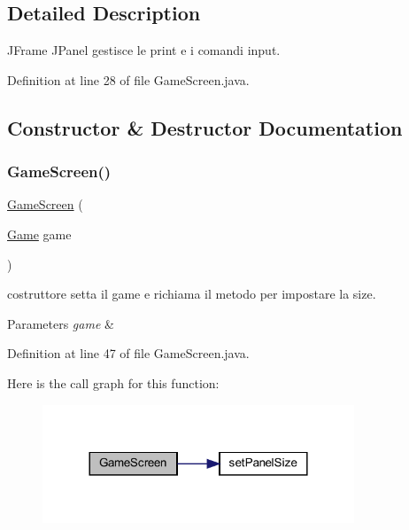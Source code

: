 \subsection{Detailed Description}
J\+Frame J\+Panel gestisce le print e i comandi input. 

Definition at line 28 of file Game\+Screen.\+java.



\subsection{Constructor \& Destructor Documentation}
\mbox{\label{classprogetto_1_1_game_screen_ab2b34a3390e240329bfdd0848fe5cd8c}} 
\subsubsection{\texorpdfstring{Game\+Screen()}{GameScreen()}}
{\footnotesize\ttfamily \hyperlink{classprogetto_1_1_game_screen}{Game\+Screen} (\begin{DoxyParamCaption}\item[{\hyperlink{classprogetto_1_1_game}{Game}}]{game }\end{DoxyParamCaption})}



costruttore setta il game e richiama il metodo per impostare la size. 


\begin{DoxyParams}{Parameters}
{\em game} & \\
\hline
\end{DoxyParams}


Definition at line 47 of file Game\+Screen.\+java.

Here is the call graph for this function\+:\nopagebreak
\begin{figure}[H]
\begin{center}
\leavevmode
\includegraphics[width=264pt]{classprogetto_1_1_game_screen_ab2b34a3390e240329bfdd0848fe5cd8c_cgraph}
\end{center}
\end{figure}


